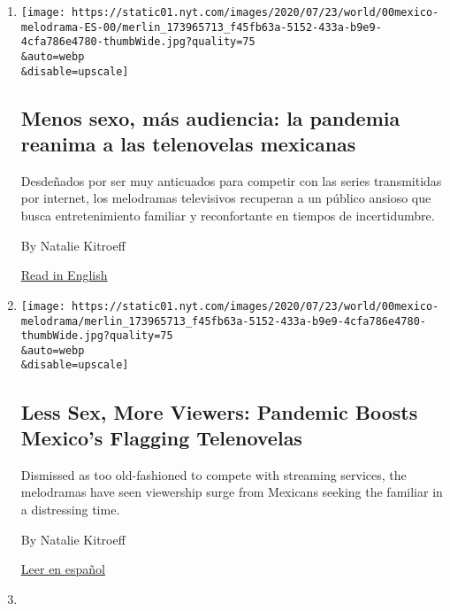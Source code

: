 \begin{enumerate}
\def\labelenumi{\arabic{enumi}.}
\item
  \href{/es/2020/08/02/espanol/america-latina/televisa-rosa-de-guadalupe-netflix.html}{}

  \texttt{[image: https://static01.nyt.com/images/2020/07/23/world/00mexico-melodrama-ES-00/merlin\_173965713\_f45fb63a-5152-433a-b9e9-4cfa786e4780-thumbWide.jpg?quality=75\\\&auto=webp\\\&disable=upscale]}

  \hypertarget{menos-sexo-muxe1s-audiencia-la-pandemia-reanima-a-las-telenovelas-mexicanas}{%
  \subsection{Menos sexo, más audiencia: la pandemia reanima a las
  telenovelas
  mexicanas}\label{menos-sexo-muxe1s-audiencia-la-pandemia-reanima-a-las-telenovelas-mexicanas}}

  Desdeñados por ser muy anticuados para competir con las series
  transmitidas por internet, los melodramas televisivos recuperan a un
  público ansioso que busca entretenimiento familiar y reconfortante en
  tiempos de incertidumbre.

  By Natalie Kitroeff

  \href{https://www.nytimes.com/2020/08/02/world/americas/mexico-tv-virus-telenovela.html}{Read
  in English}
\item
  \href{/2020/08/02/world/americas/mexico-tv-virus-telenovela.html}{}

  \texttt{[image: https://static01.nyt.com/images/2020/07/23/world/00mexico-melodrama/merlin\_173965713\_f45fb63a-5152-433a-b9e9-4cfa786e4780-thumbWide.jpg?quality=75\\\&auto=webp\\\&disable=upscale]}

  \hypertarget{less-sex-more-viewers-pandemic-boosts-mexicos-flagging-telenovelas}{%
  \subsection{Less Sex, More Viewers: Pandemic Boosts Mexico's Flagging
  Telenovelas}\label{less-sex-more-viewers-pandemic-boosts-mexicos-flagging-telenovelas}}

  Dismissed as too old-fashioned to compete with streaming services, the
  melodramas have seen viewership surge from Mexicans seeking the
  familiar in a distressing time.

  By Natalie Kitroeff

  \href{https://www.nytimes.com/es/2020/08/02/espanol/america-latina/televisa-rosa-de-guadalupe-netflix.html}{Leer
  en español}
\item
  \href{/2020/07/07/world/americas/mexico-43-missing-students-remains.html}{}


\end{enumerate}
